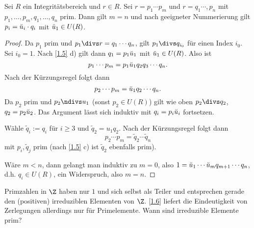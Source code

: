 \begin{st} \label{1.6}
	Sei $R$ ein Integritätsbereich und $r \in R$.
	Sei $r = p_1 \dotsb p_m$ und $r = q_1 \dotsb, p_n$ mit $p_1, \dotsc, p_m, q_1, \dotsc, q_n$ prim.
	Dann gilt $m = n$ und nach geeigneter Nummerierung gilt $p_i = \breve{u}_i \cdot q_i$ mit $\breve{u}_1 \in U(R)$.
	\begin{proof}
		Da $p_1$ prim und $p_1 \divs r = q_1 \dotsb q_n$, gilt $p_1 \divs  q_{i_0}$ für einen Index $i_0$.
		Sei \oBdA $i_0 = 1$.
		Nach \ref{1.5} d) gilt dann $q_1 = p_1 \breve{u}_1$ mit $\breve{u}_1 \in U(R)$.
		Also ist
		\[
			p_1 \dotsb p_m = p_1 \breve{u}_1 q_{2} q_3 \dotsb q_{n}.
		\]
		Nach der Kürzungsregel folgt dann
		\[
			p_2 \dotsb p_m = \breve{u}_1 q_2 \dotsb q_n.
		\]
		Da $p_2$ prim und $p_2 \ndivs u_1$ (sonst $p_2 \in U(R)$) gilt wie oben \oBdA $p_2 \divs q_2$, $q_2 = p_2 \breve{u}_2$.
		Das Argument lässt sich induktiv mit $q_i = p_i \breve{u}_i$ fortsetzen.

		Wähle $\tilde q_i := q_{i}$ für $i \ge 3$ und $\tilde q_2 = u_1 q_{2}$.
		Nach der Kürzungsregel folgt dann
		\[
			p_2 \dotsb p_m = \tilde q_2 \dotsb \tilde q_n
		\]
		mit $p_i, \tilde q_j$ prim (nach \ref{1.5} c) ist $\tilde q_2$ ebenfalls prim).

		Wäre \oBdA $m < n$, dann gelangt man induktiv zu $m = 0$, also $1 = \breve{u}_1 \dotsb \breve{u}_m q_{m+1} \dotsb q_{n}$, d.h. $q_{i} \in U(R)$, ein Widerspruch, also $m = n$.
	\end{proof}
\end{st}

Primzahlen in $\Z$ haben nur $1$ und sich selbst als Teiler und entsprechen gerade den (positiven) irreduziblen Elementen von $\Z$.
\ref{1.6} liefert die Eindeutigkeit von Zerlegungen allerdings nur für Primelemente.
Wann sind irreduzible Elemente prim?


